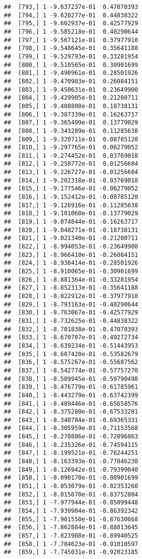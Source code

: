 \documentclass[
  12pt,
]{article}
\begin{document}
\begin{verbatim}
##  [793,] 1 -9.637237e-01  0.47070393
##  [794,] 1 -9.620277e-01  0.44838322
##  [795,] 1 -9.602937e-01  0.42577929
##  [796,] 1 -9.585218e-01  0.40290644
##  [797,] 1 -9.567121e-01  0.37977910
##  [798,] 1 -9.548645e-01  0.35641188
##  [799,] 1 -9.529793e-01  0.33281954
##  [800,] 1 -9.510565e-01  0.30901699
##  [801,] 1 -9.490961e-01  0.28501926
##  [802,] 1 -9.470983e-01  0.26084151
##  [803,] 1 -9.450631e-01  0.23649900
##  [804,] 1 -9.429905e-01  0.21200711
##  [805,] 1 -9.408808e-01  0.18738131
##  [806,] 1 -9.387339e-01  0.16263717
##  [807,] 1 -9.365499e-01  0.13779029
##  [808,] 1 -9.343289e-01  0.11285638
##  [809,] 1 -9.320711e-01  0.08785120
##  [810,] 1 -9.297765e-01  0.06279052
##  [811,] 1 -9.274452e-01  0.03769018
##  [812,] 1 -9.250772e-01  0.01256604
##  [813,] 1 -9.226727e-01 -0.01256604
##  [814,] 1 -9.202318e-01 -0.03769018
##  [815,] 1 -9.177546e-01 -0.06279052
##  [816,] 1 -9.152412e-01 -0.08785120
##  [817,] 1 -9.126916e-01 -0.11285638
##  [818,] 1 -9.101060e-01 -0.13779029
##  [819,] 1 -9.074844e-01 -0.16263717
##  [820,] 1 -9.048271e-01 -0.18738131
##  [821,] 1 -9.021340e-01 -0.21200711
##  [822,] 1 -8.994053e-01 -0.23649900
##  [823,] 1 -8.966410e-01 -0.26084151
##  [824,] 1 -8.938414e-01 -0.28501926
##  [825,] 1 -8.910065e-01 -0.30901699
##  [826,] 1 -8.881364e-01 -0.33281954
##  [827,] 1 -8.852313e-01 -0.35641188
##  [828,] 1 -8.822912e-01 -0.37977910
##  [829,] 1 -8.793163e-01 -0.40290644
##  [830,] 1 -8.763067e-01 -0.42577929
##  [831,] 1 -8.732625e-01 -0.44838322
##  [832,] 1 -8.701838e-01 -0.47070393
##  [833,] 1 -8.670707e-01 -0.49272734
##  [834,] 1 -8.639234e-01 -0.51443953
##  [835,] 1 -8.607420e-01 -0.53582679
##  [836,] 1 -8.575267e-01 -0.55687562
##  [837,] 1 -8.542774e-01 -0.57757270
##  [838,] 1 -8.509945e-01 -0.59790498
##  [839,] 1 -8.476779e-01 -0.61785961
##  [840,] 1 -8.443279e-01 -0.63742399
##  [841,] 1 -8.409446e-01 -0.65658576
##  [842,] 1 -8.375280e-01 -0.67533281
##  [843,] 1 -8.340784e-01 -0.69365331
##  [844,] 1 -8.305959e-01 -0.71153568
##  [845,] 1 -8.270806e-01 -0.72896863
##  [846,] 1 -8.235326e-01 -0.74594115
##  [847,] 1 -8.199521e-01 -0.76244251
##  [848,] 1 -8.163393e-01 -0.77846230
##  [849,] 1 -8.126942e-01 -0.79399040
##  [850,] 1 -8.090170e-01 -0.80901699
##  [851,] 1 -8.053079e-01 -0.82353260
##  [852,] 1 -8.015670e-01 -0.83752804
##  [853,] 1 -7.977944e-01 -0.85099448
##  [854,] 1 -7.939904e-01 -0.86392342
##  [855,] 1 -7.901550e-01 -0.87630668
##  [856,] 1 -7.862884e-01 -0.88813645
##  [857,] 1 -7.823908e-01 -0.89940525
##  [858,] 1 -7.784623e-01 -0.91010597
##  [859,] 1 -7.745031e-01 -0.92023185

\end{verbatim}
\end{document}
